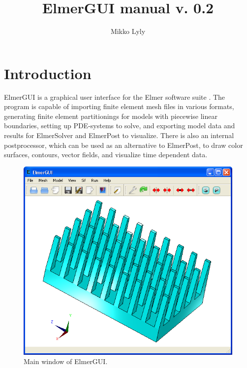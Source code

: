 \documentclass[a4paper,12pt]{article}
\title{ElmerGUI manual v. 0.2}
\author{Mikko Lyly}
\begin{document}
\maketitle

\newpage

\tableofcontents

\newpage

\section{Introduction}

ElmerGUI is a graphical user interface for the Elmer software suite
\cite{ElmerHome}. The program is capable of importing finite element mesh files in
various formats, generating finite element partitionings for models with piecewise
linear boundaries, setting up PDE-systems to solve, and exporting model data and results
for ElmerSolver and ElmerPost to visualize. There is also an internal postprocessor,
which can be used as an alternative to ElmerPost, to draw color surfaces, contours, 
vector fields, and visualize time dependent data.

\begin{figure}[ht]
\begin{center}
 \includegraphics[scale=0.5]{images/elmergui.png}
\caption{Main window of ElmerGUI.}
\end{center}
\end{figure}
\end{document}

